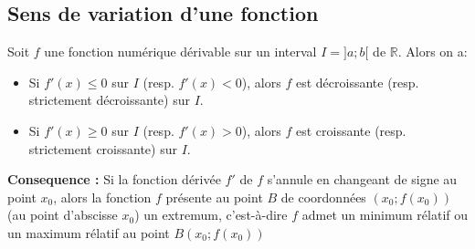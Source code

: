 \documentclass[a4paper, 12pt]{report}
\begin{document}
            \subsection{Sens de variation d'une fonction}
                Soit $f$ une fonction numérique dérivable sur un interval $I=]a;b[$ de $\mathbb{R}$. Alors on a: 
                \begin{itemize}
                    \item Si $f'(x)\leq 0$ sur $I$ (resp. $f'(x)<0$), alors $f$ est décroissante (resp. strictement décroissante) sur $I$.
                    \item Si $f'(x)\geq 0$ sur $I$ (resp. $f'(x)>0$), alors $f$ est croissante (resp. strictement croissante) sur $I$.
                \end{itemize}
                \textbf{Consequence : } Si la fonction dérivée $f'$ de $f$ s'annule en changeant de signe au point $x_0$, alors la fonction $f$ 
                présente au point $B$ de coordonnées $(x_0;f(x_0))$ (au point d'abscisse $x_0$) un extremum, c'est-à-dire $f$ admet un minimum
                rélatif ou un maximum rélatif au point $B(x_0;f(x_0))$
\end{document}
